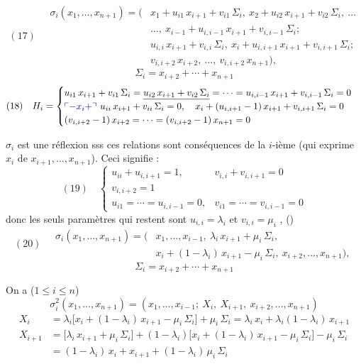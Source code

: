 \documentclass[11pt,a4paper]{article}
\begin{document}
\[
(17)\quad \begin{aligned}
\sigma_i(x_1,\dots,x_{n+1}) = \bigl(&x_1 + u_{i1}\,x_{i+1} + v_{i1}\,\Sigma_i,\ x_2 + u_{i2}\,x_{i+1} + v_{i2}\,\Sigma_i,\ \dots\\
&\dots,\ x_{i-1} + u_{i,i-1}\,x_{i+1} + v_{i,i-1}\,\Sigma_i ;\\
&u_{i,i}\,x_{i+1} + v_{i,i}\,\Sigma_i,\ x_i + u_{i,i+1}\,x_{i+1} + v_{i,i+1}\,\Sigma_i ;\\
&v_{i,i+2}\,x_{i+2},\ \dots,\ v_{i,i+2}\,x_{n+1}\bigr),
\end{aligned}
\]
\[
\Sigma_i = x_{i+2} + \cdots + x_{n+1}
\]
\[
(18)\quad H_i = \begin{cases}
u_{i1}\,x_{i+1} + v_{i1}\,\Sigma_i = \uncertain{u_{i2}\,x_{i+1} + v_{i2}\,\Sigma_i} = \cdots = u_{i,i-1}\,x_{i+1} + v_{i,i-1}\,\Sigma_i = 0\\
\add{-x_i+}\ u_{ii}\,x_{i+1} + v_{ii}\,\Sigma_i = 0,\quad x_i + (u_{i,i+1}-1)\,x_{i+1} + v_{i,i+1}\,\Sigma_i = 0\\
(v_{i,i+2}-1)\,x_{i+2} = \cdots = (v_{i,i+2}-1)\,x_{n+1} = 0
\end{cases}
\]

$\sigma_i$ est une réflexion sss ces relations sont conséquences de la $i$-ième (qui exprime $x_i$  de $x_{i+1},\dots,x_{n+1}$). Ceci signifie :
\[
(19)\quad \begin{cases}
u_{ii} + u_{i,i+1} = 1, & v_{i,i} + v_{i,i+1} = 0\\
v_{i,i+2} = 1\\
u_{i1} = \cdots = u_{i,i-1} = 0, & v_{i1} = \cdots = v_{i,i-1} = 0
\end{cases}
\]
donc les seuls paramètres qui restent sont $u_{i,i} = \lambda_i$ et $v_{i,i} = \mu_i$ , (\ill{})
\[
(20)\quad \begin{aligned}
\sigma_i(x_1,\dots,x_{n+1}) = \bigl(&x_1,\dots,x_{i-1},\ \lambda_i\,x_{i+1} + \mu_i\,\Sigma_i,\\
&x_i + (1-\lambda_i)\,x_{i+1} - \mu_i\,\Sigma_i,\ x_{i+2},\dots,x_{n+1}\bigr),
\end{aligned}
\]
\[
\Sigma_i = x_{i+2}+\cdots+x_{n+1}
\]

On a ($1\le i\le n$)
\[
\sigma_i^2(x_1,\dots,x_{n+1}) = (x_1,\dots,x_{i-1};\ X_i,\ X_{i+1},\ x_{i+2},\dots,x_{n+1})
\]
\[
\begin{aligned}
X_i &= \lambda_i\bigl[x_i + (1-\lambda_i)\,x_{i+1} - \mu_i\,\Sigma_i\bigr] + \mu_i\,\Sigma_i = \lambda_i\,x_i + \lambda_i(1-\lambda_i)\,x_{i+1}\\
X_{i+1} &= \bigl[\lambda_i\,x_{i+1} + \mu_i\,\Sigma_i\bigr] + (1-\lambda_i)\bigl[x_i + (1-\lambda_i)\,x_{i+1} - \mu_i\,\Sigma_i\bigr] - \mu_i\,\Sigma_i\\
&= (1-\lambda_i)\,x_i + x_{i+1} + (1-\lambda_i)\,\mu_i\,\Sigma_i
\end{aligned}
\]
\end{document}
